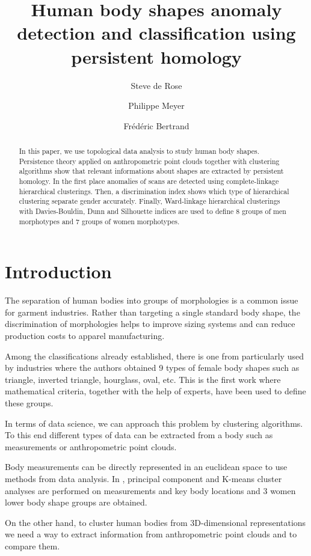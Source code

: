 \documentclass[twocolumn]{article}
\title{Human body shapes anomaly detection and classification using persistent homology}
\author[1,2]{Steve de Rose}
\author[1]{Philippe Meyer}
\author[1]{Frédéric Bertrand}
\affil[1]{Computer Science and Digital Society Laboratory (LIST3N), Université de Technologie de Troyes, Troyes, France}
\affil[2]{Institut de Recherche Mathématique Avancée
 (IRMA), CNRS UMR 7501, Université de Strasbourg, Strasbourg, France}
\date{}
\begin{document}
\maketitle

\begin{abstract}
In this paper, we use topological data analysis to study human body shapes. Persistence theory applied on anthropometric point clouds together with clustering algorithms show that relevant informations about shapes are extracted by persistent homology. In the first place anomalies of scans are detected using complete-linkage hierarchical clusterings. Then, a discrimination index shows which type of hierarchical clustering separate gender accurately. Finally, Ward-linkage hierarchical clusterings with Davies-Bouldin, Dunn and Silhouette indices are used to define 8 groups of men morphotypes and 7 groups of women morphotypes.
\end{abstract}

\section{Introduction}

The separation of human bodies into groups of morphologies is a common issue for garment industries. Rather than targeting a single standard body shape, the discrimination of morphologies helps to improve sizing systems and can reduce production costs to apparel manufacturing.

Among the classifications already established, there is one from \cite{SKO04} particularly used by industries where the authors obtained 9 types of female body shapes such as triangle, inverted triangle, hourglass, oval, etc. This is the first work where mathematical criteria, together with the help of experts, have been used to define these groups.
\vspace{0.2cm}

In terms of data science, we can approach this problem by clustering algorithms. To this end different types of data can be extracted from a body such as measurements or anthropometric point clouds.

Body measurements can be directly represented in an euclidean space to use methods from data analysis. In \cite{SA11}, principal component and K-means cluster analyses are performed on measurements and key body locations and 3 women lower body shape groups are obtained.

On the other hand, to cluster human bodies from 3D-dimensional representations we need a way to extract information from anthropometric point clouds and to compare them.
\end{document}
